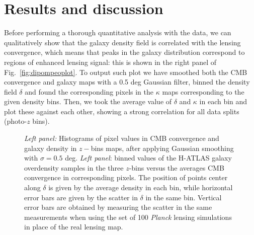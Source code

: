 
\section{Results and discussion}
Before performing a thorough quantitative analysis with the data, we can qualitatively show that the galaxy density field is correlated with the lensing convergence, which means that peaks in the galaxy distribution correspond to regions of enhanced lensing signal: this is shown in the right panel of Fig.~\eqref{fig:dipompeoplot}. To output such plot we have smoothed both the \gls{CMB} convergence and galaxy maps with a 0.5 deg Gaussian filter, binned the density field $\delta$ and found the corresponding pixels in the $\kappa$ maps corresponding to the given density bins. Then, we took the average value of $\delta$ and $\kappa$ in each bin and plot these against each other, showing a strong correlation for all data splits (photo-$z$ bins).


\begin{figure}[t]
    \centering
    \qquad
    \caption{\textit{Left panel:} Histograms of pixel values in \gls{CMB} convergence and galaxy density in $z-$bins maps, after applying Gaussian smoothing with $\sigma = 0.5$ deg. \textit{Left panel}: binned values of the H-ATLAS galaxy overdensity samples in the three $z$-bins versus the averages \gls{CMB} convergence in corresponding pixels. The position of points center along $\delta$ is given by the average density in each bin, while horizontal error bars are given by the scatter in $\delta$ in the same bin. Vertical error bars are obtained by measuring the scatter in the same measurements when using the set of 100 \textit{Planck} lensing simulations in place of the real lensing map.}%
    \label{fig:dipompeoplot}%
\end{figure}


